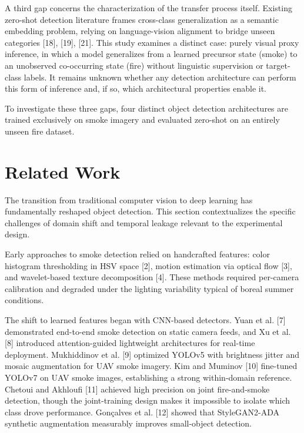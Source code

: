 \documentclass[conference]{IEEEtran}
\begin{document}
A third gap concerns the characterization of the transfer process itself. Existing zero-shot detection literature frames cross-class generalization as a semantic embedding problem, relying on language-vision alignment to bridge unseen categories [18], [19], [21]. This study examines a distinct case: purely visual proxy inference, in which a model generalizes from a learned precursor state (smoke) to an unobserved co-occurring state (fire) without linguistic supervision or target-class labels. It remains unknown whether any detection architecture can perform this form of inference and, if so, which architectural properties enable it.

To investigate these three gaps, four distinct object detection architectures are trained exclusively on smoke imagery and evaluated zero-shot on an entirely unseen fire dataset.

\section{Related Work}
The transition from traditional computer vision to deep learning has fundamentally reshaped object detection. This section contextualizes the specific challenges of domain shift and temporal leakage relevant to the experimental design.

Early approaches to smoke detection relied on handcrafted features: color histogram thresholding in HSV space [2], motion estimation via optical flow [3], and wavelet-based texture decomposition [4]. These methods required per-camera calibration and degraded under the lighting variability typical of boreal summer conditions.

The shift to learned features began with CNN-based detectors. Yuan et al. [7] demonstrated end-to-end smoke detection on static camera feeds, and Xu et al. [8] introduced attention-guided lightweight architectures for real-time deployment. Mukhiddinov et al. [9] optimized YOLOv5 with brightness jitter and mosaic augmentation for UAV smoke imagery. Kim and Muminov [10] fine-tuned YOLOv7 on UAV smoke images, establishing a strong within-domain reference. Chetoui and Akhloufi [11] achieved high precision on joint fire-and-smoke detection, though the joint-training design makes it impossible to isolate which class drove performance. Gon\c{c}alves et al. [12] showed that StyleGAN2-ADA synthetic augmentation measurably improves small-object detection.
\end{document}

